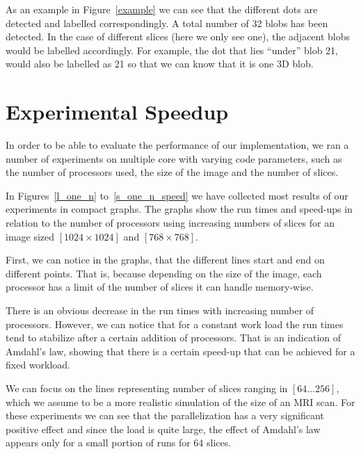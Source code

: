 \documentclass[a4paper,12pt]{article}
\begin{document}
As an example in Figure~\ref{example} we can see that the different dots are detected and labelled correspondingly. A total number of 32 blobs has been detected. In the case of different slices (here we only see one), the adjacent blobs would be labelled accordingly. For example, the dot that lies ``under'' blob 21, would also be labelled as 21 so that we can know that it is one 3D blob.

\section{Experimental Speedup}
In order to be able to evaluate the performance of our implementation, we ran a number of experiments on multiple core with varying code parameters, such as the number of processors used, the size of the image and the number of slices.

In Figures~\ref{l_one_n} to~\ref{s_one_n_speed} we have collected most results of our experiments in compact graphs. The graphs show the run times and speed-ups in relation to the number of processors using increasing numbers of slices for an image sized $[1024 \times 1024]$ and $[768 \times 768]$.

First, we can notice in the graphs, that the different lines start and end on different points. That is, because depending on the size of the image, each processor has a limit of the number of slices it can handle memory-wise.

There is an obvious decrease in the run times with increasing number of processors. However, we can notice that for a constant work load the run times tend to stabilize after a certain addition of processors. That is an indication of Amdahl's law, showing that there is a certain speed-up that can be achieved for a fixed workload.

We can focus on the lines representing number of slices ranging in $[64 \ldots 256]$, which we assume to be a more realistic simulation of the size of an MRI scan. For these experiments we can see that the parallelization has a very significant positive effect and since the load is quite large, the effect of Amdahl's law appears only for a small portion of runs for 64 slices.
\end{document}
